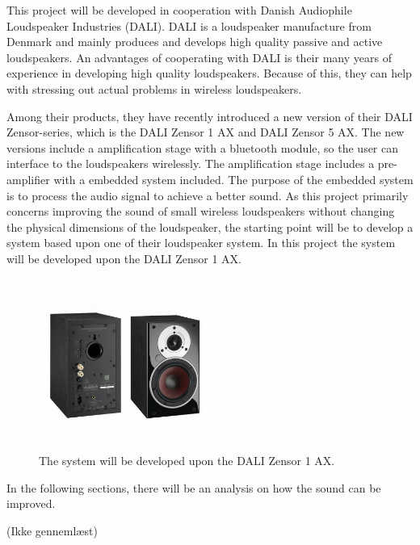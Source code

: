 This project will be developed in cooperation with Danish Audiophile Loudspeaker Industries (DALI). DALI is a loudspeaker manufacture from Denmark and mainly produces and develops high quality passive and active loudspeakers. An advantages of cooperating with DALI is their many years of experience in developing high quality loudspeakers. Because of this, they can help with stressing out actual problems in wireless loudspeakers.

Among their products, they have recently introduced a new version of their DALI Zensor-series, which is the DALI Zensor 1 AX and DALI Zensor 5 AX. The  new versions include a amplification stage with a bluetooth module, so the user can interface to the loudspeakers wirelessly. The amplification stage includes a pre-amplifier with a embedded system included. The purpose of the embedded system is to process the audio signal to achieve a better sound.
As this project primarily concerns improving the sound of small wireless loudspeakers without changing the physical dimensions of the loudspeaker, the starting point will be to develop a system based upon one of their loudspeaker system. In this project the system will be developed upon the DALI Zensor 1 AX.

\begin{figure}[H]
\centering
\includegraphics[width=0.5\textwidth]{figures/dali_zensor_1_ax.jpg}
\caption{The system will be developed upon the DALI Zensor 1 AX.}
\label{fig:dali_zensor}
\end{figure}

In the following sections, there will be an analysis on how the sound can be improved.

(Ikke gennemlæst)







